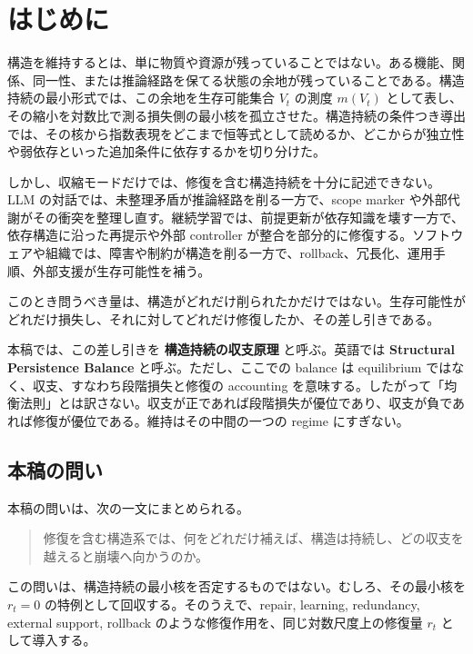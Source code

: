 \documentclass[12pt,a4paper]{article}
\begin{document}
\section{はじめに}\label{ux306fux3058ux3081ux306b}

構造を維持するとは、単に物質や資源が残っていることではない。ある機能、関係、同一性、または推論経路を保てる状態の余地が残っていることである。構造持続の最小形式では、この余地を生存可能集合 \(V_{t}\) の測度 \(m(V_{t})\) として表し、その縮小を対数比で測る損失側の最小核を孤立させた。構造持続の条件つき導出では、その核から指数表現をどこまで恒等式として読めるか、どこからが独立性や弱依存といった追加条件に依存するかを切り分けた。

しかし、収縮モードだけでは、修復を含む構造持続を十分に記述できない。LLM の対話では、未整理矛盾が推論経路を削る一方で、scope marker や外部代謝がその衝突を整理し直す。継続学習では、前提更新が依存知識を壊す一方で、依存構造に沿った再提示や外部 controller が整合を部分的に修復する。ソフトウェアや組織では、障害や制約が構造を削る一方で、rollback、冗長化、運用手順、外部支援が生存可能性を補う。

このとき問うべき量は、構造がどれだけ削られたかだけではない。生存可能性がどれだけ損失し、それに対してどれだけ修復したか、その差し引きである。

本稿では、この差し引きを \textbf{構造持続の収支原理} と呼ぶ。英語では \textbf{Structural Persistence Balance} と呼ぶ。ただし、ここでの balance は equilibrium ではなく、収支、すなわち段階損失と修復の accounting を意味する。したがって「均衡法則」とは訳さない。収支が正であれば段階損失が優位であり、収支が負であれば修復が優位である。維持はその中間の一つの regime にすぎない。

\subsection{本稿の問い}\label{ux672cux7a3fux306eux554fux3044}

本稿の問いは、次の一文にまとめられる。

\begin{quote}
修復を含む構造系では、何をどれだけ補えば、構造は持続し、どの収支を越えると崩壊へ向かうのか。
\end{quote}

この問いは、構造持続の最小核を否定するものではない。むしろ、その最小核を \(r_{t}=0\) の特例として回収する。そのうえで、repair, learning, redundancy, external support, rollback のような修復作用を、同じ対数尺度上の修復量 \(r_{t}\) として導入する。
\end{document}
